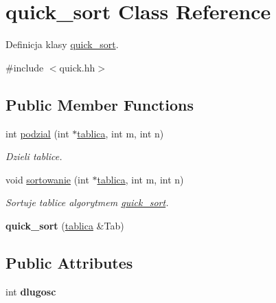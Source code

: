 \hypertarget{classquick__sort}{\section{quick\-\_\-sort \-Class \-Reference}
\label{classquick__sort}
}


\-Definicja klasy \hyperlink{classquick__sort}{quick\-\_\-sort}.  




{\ttfamily \#include $<$quick.\-hh$>$}

\subsection*{\-Public \-Member \-Functions}
\begin{DoxyCompactItemize}
\item 
int \hyperlink{classquick__sort_ac7662bc98e198bcde63da53dd8a73766}{podzial} (int $\ast$\hyperlink{classtablica}{tablica}, int m, int n)
\begin{DoxyCompactList}\small\item\em \-Dzieli tablice. \end{DoxyCompactList}\item 
void \hyperlink{classquick__sort_a521710deada27c086ab065f8d1ad6bd4}{sortowanie} (int $\ast$\hyperlink{classtablica}{tablica}, int m, int n)
\begin{DoxyCompactList}\small\item\em \-Sortuje tablice algorytmem \hyperlink{classquick__sort}{quick\-\_\-sort}. \end{DoxyCompactList}\item 
\hypertarget{classquick__sort_a6cb8d0edf6e9501f766c5ba77ce37a6b}{{\bfseries quick\-\_\-sort} (\hyperlink{classtablica}{tablica} \&\-Tab)}\label{classquick__sort_a6cb8d0edf6e9501f766c5ba77ce37a6b}

\end{DoxyCompactItemize}
\subsection*{\-Public \-Attributes}
\begin{DoxyCompactItemize}
\item 
\hypertarget{classquick__sort_a7d9df8d9808d9c23b156add5724d9744}{int {\bfseries dlugosc}}\label{classquick__sort_a7d9df8d9808d9c23b156add5724d9744}

\end{DoxyCompactItemize}


